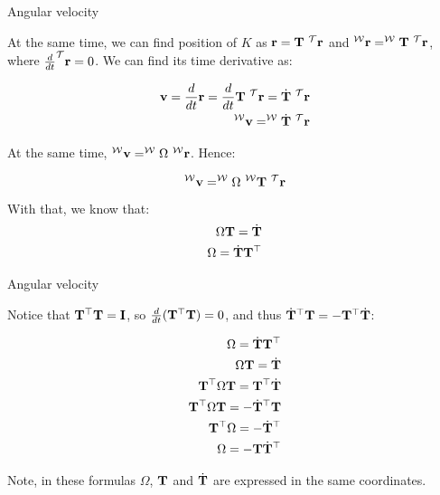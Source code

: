 \documentclass{beamer}
\begin{document}
\begin{frame}{Angular velocity}
	\begin{flushleft}
		
		At the same time, we can find position of $K$ as $\mathbf{r} =\mathbf{T} \ ^{\mathcal T} \mathbf{r}$ and $^{\mathcal W}\mathbf{r} =^{\mathcal W}\mathbf{T} \ ^{\mathcal T} \mathbf{r}$, where $\frac{d}{dt} ^{\mathcal T} \mathbf{r} = 0$. We can find its time derivative as:
		
		
		\begin{align}
			\bo{v} = \frac{d}{dt} \bo{r} = \frac{d}{dt} \bo{T} \ ^{\mathcal T} \bo{r} 
			= \dot{ \bo{T} } \ ^{\mathcal T} \bo{r} \\
				^{\mathcal W}\bo{v} = ^{\mathcal W}\dot{ \bo{T} } \ ^{\mathcal T} \bo{r}
		\end{align}
		
		At the same time, $^{\mathcal W}\mathbf{v} =  ^{\mathcal W}\Omega \ ^{\mathcal W}\mathbf{r} $. Hence:
		
		\begin{equation}
			^{\mathcal W}\mathbf{v} =  ^{\mathcal W}\Omega \ ^{\mathcal W}\mathbf{T} \ ^{\mathcal T} \mathbf{r}
		\end{equation}		
	
		With that, we know that:
		\begin{align}
			\Omega \mathbf{T} = \dot{ \mathbf{T} } \\
			\Omega = \dot{ \mathbf{T} } \mathbf{T}^\top
		\end{align}				
		
	\end{flushleft}
\end{frame}





\begin{frame}{Angular velocity}
	\begin{flushleft}
		
		
		Notice that $\mathbf{T}^\top \mathbf{T} = \mathbf{I}$, so $ \frac{d}{dt} (\mathbf{T}^\top \mathbf{T}) = 0$, and thus  $\dot{ \mathbf{T} }^\top \mathbf{T} = -\mathbf{T}^\top \dot{ \mathbf{T} } $:
		
		\begin{align}
			\Omega = \dot{ \mathbf{T} } \mathbf{T}^\top \\
			\Omega \mathbf{T} = \dot{ \mathbf{T} } \\
			\mathbf{T}^\top \Omega \mathbf{T} = \mathbf{T}^\top \dot{ \mathbf{T} } \\
			\mathbf{T}^\top \Omega \mathbf{T} = -\dot{ \mathbf{T} }^\top \mathbf{T} \\
			\mathbf{T}^\top \Omega  = -\dot{ \mathbf{T} }^\top \\
			\Omega  = -\mathbf{T} \dot{ \mathbf{T} }^\top 
		\end{align}		
	
	Note, in these formulas $\Omega$, $\mathbf{T}$ and $\dot{ \mathbf{T} }$ are expressed in the same coordinates.
	
	\end{flushleft}
\end{frame}
\end{document}
